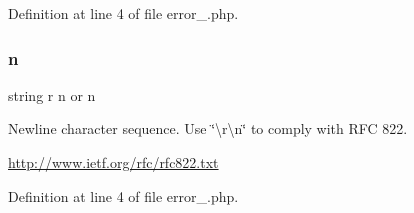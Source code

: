Definition at line 4 of file error\+\_.\+php.

\mbox{\label{cli_2error__404_8php_a958071ac50ebec838e917de66e151e7e}} 
\subsubsection{\texorpdfstring{n}{n}}
{\footnotesize\ttfamily string r n or n}

Newline character sequence. Use \char`\"{}\textbackslash{}r\textbackslash{}n\char`\"{} to comply with R\+FC 822.

\mbox{\hyperlink{}{http\+://www.\+ietf.\+org/rfc/rfc822.\+txt}}

Definition at line 4 of file error\+\_.\+php.

